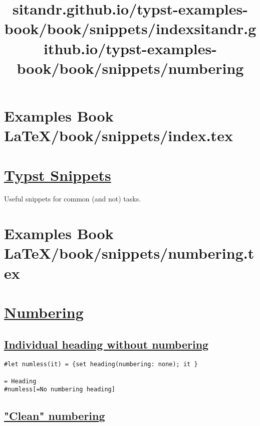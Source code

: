 \section{Examples Book LaTeX/book/snippets/index.tex}
\title{sitandr.github.io/typst-examples-book/book/snippets/index}

\section{\texorpdfstring{\hyperref[typst-snippets]{Typst
Snippets}}{Typst Snippets}}\label{typst-snippets}

Useful snippets for common (and not) tasks.


\section{Examples Book LaTeX/book/snippets/numbering.tex}
\title{sitandr.github.io/typst-examples-book/book/snippets/numbering}

\section{\texorpdfstring{\hyperref[numbering]{Numbering}}{Numbering}}\label{numbering}

\subsection{\texorpdfstring{\hyperref[individual-heading-without-numbering]{Individual
heading without
numbering}}{Individual heading without numbering}}\label{individual-heading-without-numbering}

\begin{verbatim}
#let numless(it) = {set heading(numbering: none); it }

= Heading
#numless[=No numbering heading]
\end{verbatim}

\pandocbounded{}

\subsection{\texorpdfstring{\hyperref[clean-numbering]{"Clean"
numbering}}{"Clean" numbering}}\label{clean-numbering}

